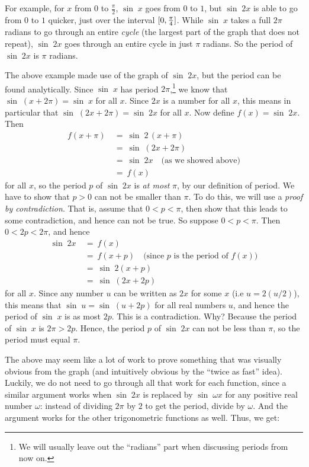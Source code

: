 \begin{exmp}
 For example, for $x$ from $0$ to $\frac{\pi}{2}$, $\sin\;x$ goes from $0$ to $1$, but $\sin\;2x$
 is able to go from $0$ to $1$ quicker, just over the interval $\lbrack 0,\frac{\pi}{4} \rbrack$.
 While $\sin\;x$ takes a full $2\pi$ radians to go through an entire \emph{cycle} (the
 largest part of the graph that does not repeat), $\sin\;2x$ goes through an entire cycle in just
 $\pi$ radians. So the period of $\sin\;2x$ is $\pi$ radians.
\end{exmp}
\divider
\newpage
The above example made use of the graph of $\sin\;2x$, but the period can be found analytically.
Since $\sin\;x$ has period $2\pi$,\footnote{We will usually leave out the ``radians'' part when
discussing periods from now on.} we know that $\sin\;(x+2\pi) = \sin\;x$ for all $x$. Since $2x$
is a number for all $x$, this means in particular that $\sin\;(2x+2\pi) = \sin\;2x$ for all $x$.
Now define $f(x)=\sin\;2x$. Then
\begin{align*}
 f(x+\pi) ~&=~ \sin\;2\,(x+\pi)\\
 &=~ \sin\;(2x+2\pi)\\
 &=~ \sin\;2x \quad\text{(as we showed above)}\\
 &=~ f(x)
\end{align*}
for all $x$, so the period $p$ of $\sin\;2x$ is \emph{at most} $\pi$, by our definition of period.
We have to show that $p>0$ can not be smaller than $\pi$. To do this, we will use a \emph{proof by
contradiction}. That is, assume that $0<p<\pi$, then show that this leads to some
contradiction, and hence can not be true. So suppose $0<p<\pi$. Then $0<2p<2\pi$, and hence
\begin{align*}
 \sin\;2x ~&=~ f(x)\\
 &=~ f(x+p) \quad\text{(since $p$ is the period of $f(x)$)}\\
 &=~ \sin\;2(x+p)\\
 &=~ \sin\;(2x+2p)
\end{align*}
for all $x$. Since any number $u$ can be written as $2x$ for some $x$ (i.e $u = 2(u/2)$), this
means that $\sin\;u = \sin\;(u+2p)$ for all real numbers $u$, and hence the period of $\sin\;x$ is
as most $2p$. This is a contradiction. Why? Because the period of $\sin\;x$ is $2\pi > 2p$. Hence,
the period $p$ of $\sin\;2x$ can not be less than $\pi$, so the period must equal $\pi$.

The above may seem like a lot of work to prove something that was visually obvious from the graph
(and intuitively obvious by the ``twice as fast'' idea). Luckily, we do not need to go through all
that work for each function, since a similar argument works when $\sin\;2x$ is replaced by
$\sin\;\omega x$ for any positive real number $\omega$: instead of dividing $2\pi$ by $2$ to get
the period, divide by $\omega$. And the argument works for the other trigonometric functions as
well. Thus, we get:


